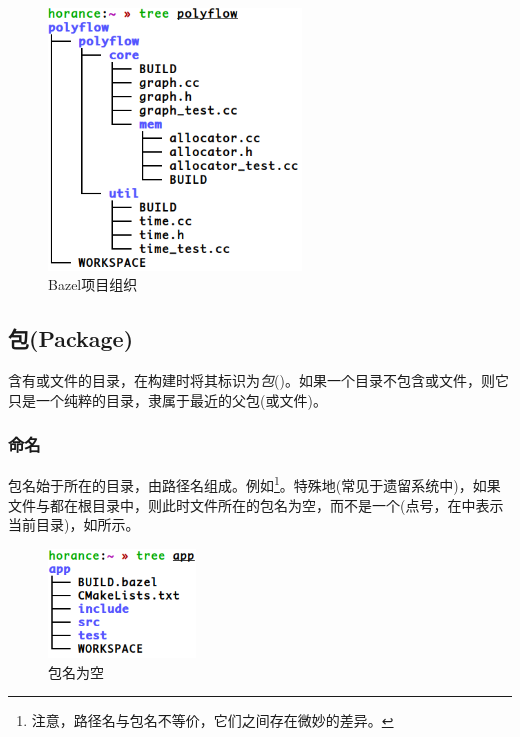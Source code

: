\begin{content}
\begin{figure}[H]
\centering
\includegraphics[width=0.6\textwidth]{figures/bazel-concept-polyflow.png}
\caption{Bazel项目组织}
 \label{fig:bazel-concept-polyflow}
\end{figure}

\subsection{包(Package)}

含有或文件的目录，在构建时将其标识为\emph{包}()。如果一个目录不包含或文件，则它只是一个纯粹的目录，隶属于最近的父包(或文件)。

\subsubsection{命名}

包名始于所在的目录，由路径名组成。例如\footnote{注意，路径名与包名不等价，它们之间存在微妙的差异。}。特殊地(常见于遗留系统中)，如果文件与都在根目录中，则此时文件所在的包名为空，而不是一个(点号，在中表示当前目录)，如所示。

\begin{figure}[H]
\centering
\includegraphics[width=0.35\textwidth]{figures/bazel-concept-nil-package.png}
\caption{包名为空}
 \label{fig:bazel-concept-nil-package}
\end{figure}


\end{content}
